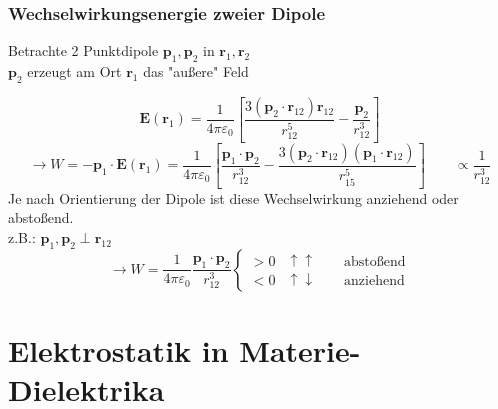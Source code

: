 \documentclass[titlepage,11pt,a4paper,ngerman]{report}
\newcommand{\tx}[1]{\textrm{#1}}
\renewcommand{\vec}[1]{\boldsymbol{#1}}
\renewcommand{\epsilon}{\varepsilon}
\begin{document}
\noindent
\begin{minipage}{.5\linewidth}
	
	\subsubsection{Wechselwirkungsenergie zweier Dipole}
	
	Betrachte 2 Punktdipole $\vec{p}_1,\vec{p}_2$ in $\vec{r}_1,\vec{r}_2$\\
	$\vec{p}_2$ erzeugt am Ort $\vec{r}_1$ das "au\ss ere" Feld
\end{minipage}%
\begin{minipage}{.5\linewidth}
	\centering
	\vspace{10pt}
\end{minipage}%
\[\vec{E}(\vec{r}_1)=\frac{1}{4\pi\epsilon_0}\left[\frac{3(\vec{p}_2\cdot\vec{r}_{12})\vec{r}_{12}}{r_{12}^5}-\frac{\vec{p}_2}{r_{12}^3}\right]\]
\[\rightarrow W=-\vec{p}_1\cdot\vec{E}(\vec{r}_1)=\frac{1}{4\pi\epsilon_0}\left[\frac{\vec{p}_1\cdot\vec{p}_2}{r_{12}^3}-\frac{3(\vec{p}_2\cdot\vec{r}_{12})(\vec{p}_1\cdot\vec{r}_{12})}{r_{15}^5}\right] \qquad \propto\frac{1}{r_{12}^3}\]
Je nach Orientierung der Dipole ist diese Wechselwirkung anziehend oder absto\ss end.\\
z.B.: $\vec{p}_1,\vec{p}_2\perp\vec{r}_{12}$
\[\rightarrow W=\frac{1}{4\pi\epsilon_0}\frac{\vec{p}_1\cdot\vec{p}_2}{r_{12}^3}\begin{cases}>0&\uparrow\uparrow \qquad \tx{abstoßend}\\<0&\uparrow\downarrow \qquad \tx{anziehend}\end{cases}\]



\section{Elektrostatik in Materie-Dielektrika}
\end{document}
